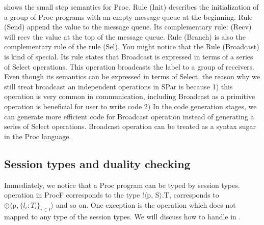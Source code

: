  shows the small step semantics for Proc. Rule (Init) describes the initialization of a group of Proc programs with an empty message queue at the beginning. Rule (Send) append the value to the message queue. Its complementary rule: (Recv) will recv the value at the top of the message queue. Rule (Branch) is also the complementary rule of the rule (Sel). You might notice that the Rule (Broadcast) is kind of special. Its rule states that Broadcast is expressed in terms of a series of Select operations. This operation broadcasts the label to a group of receivers. Even though its semantics can be expressed in terms of Select, the reason why we still treat broadcast an independent operations in SPar is because 1) this operation is very common in communication, including Broadcast as a primitive operation is beneficial for user to write code 2) In the code generation stages, we can generate more efficient code for Broadcast operation instead of generating a series of Select operations. Broadcast operation can be treated as a syntax sugar in the Proc language. %

\subsection{Session types and duality checking}
Immediately, we notice that a Proc program can be typed by session types.  operation in ProcF corresponds to the type !$\langle$p, S$\rangle$.T,  corresponds to $\oplus \langle \text{p}, \{ l_i : T_i \}_{i \in I} \rangle$ and so on. One exception is the  operation which does not mapped to any type of the session types. We will discuss how to handle  in . 

